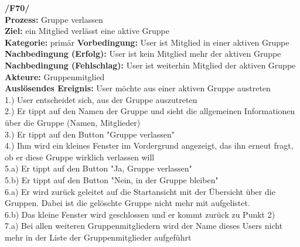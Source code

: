 \textbf{/F70/}\\
\textbf{Prozess:} Gruppe verlassen\\
\textbf{Ziel:} ein Mitglied verlässt eine aktive Gruppe\\
\textbf{Kategorie:} primär
\textbf{Vorbedingung:} User ist Mitglied in einer aktiven Gruppe
\textbf{Nachbedingung (Erfolg):} User ist kein Mitglied mehr der aktiven Gruppe\\
\textbf{Nachbedingung (Fehlschlag):} User ist weiterhin Mitglied der aktiven Gruppe\\
\textbf{Akteure:} Gruppenmitglied\\
\textbf{Auslösendes Ereignis:} User möchte aus einer aktiven Gruppe austreten\\
1.) User entscheidet sich, aus der Gruppe auszutreten\\
2.) Er tippt auf den Namen der Gruppe und sieht die allgemeinen Informationen über die Gruppe (Namen, Mitglieder)\\
3.) Er tippt auf den Button "Gruppe verlassen"\\
4.) Ihm wird ein kleines Fenster im Vordergrund angezeigt, das ihn erneut fragt, ob er diese Gruppe wirklich verlassen will\\
5.a) Er tippt auf den Button "Ja, Gruppe verlassen"\\
5.b) Er tippt auf den Button "Nein, in der Gruppe bleiben"\\
6.a) Er wird zurück geleitet auf die Startansicht mit der Übersicht über die Gruppen. Dabei ist die gelöschte Gruppe nicht mehr mit aufgelistet.\\
6.b) Das kleine Fenster wird geschlossen und er kommt zurück zu Punkt 2)\\
7.a) Bei allen weiteren Gruppenmitgliedern wird der Name dieses Users nicht mehr in der Liste der Gruppenmitglieder aufgeführt\\


